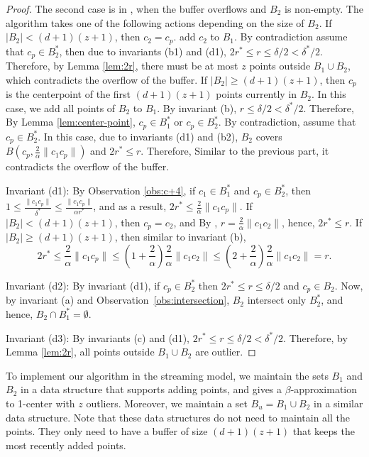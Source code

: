 \documentclass[envcountsame]{cls/cccg15}
\newcommand{\dz}{(d + 1)(z + 1)}
\newcommand{\len}[1]{\|{#1}\|}
\newcommand{\radius}[1]{\frac{2}{\alpha} \len{c_1 #1}}
\newcommand{\lee}{\leqslant}
\newcommand{\gee}{\geqslant}
\renewcommand{\leq}{\lee}
\renewcommand{\geq}{\gee}
\renewcommand{\ge}{\gee}
\begin{document}
\begin{proof}
The second case is in , when the buffer overflows and $B_2$ is non-empty.
The algorithm takes one of the following actions depending on the size of $B_2$.
If $|B_2| < \dz $, then $c_2 = c_p$.  add $c_2$ to $B_1$.
By contradiction assume that $c_p \in B_2^*$, then due to invariants (b1) and (d1), 
$2r^* \leq r \leq \delta/2 < \delta^*/2$. 
Therefore, by Lemma \ref{lem:2r}, there must be at most $z$ points outside $B_1 \cup B_2$,
which contradicts the overflow of the buffer. 
If $|B_2| \geq \dz$, then $c_p$ is the centerpoint of the first $\dz$ points currently in $B_2$. 
In this case, we add all points of $B_2$ to $B_1$. 
By invariant (b), $r \leq \delta/2 < \delta^*/2$. 
Therefore, By Lemma \ref{lem:center-point}, $c_p \in B_1^*$ or $c_p \in B_2^*$. 
By contradiction, assume that $c_p \in B_2^*$. 
In this case, due to invariants (d1) and (b2), 
$B_2$ covers $B(c_p, \radius{c_p})$ and $2r^* \leq r$. 
Therefore, Similar to the previous part, it contradicts the overflow of the buffer. 

Invariant (d1): 
By Observation \ref{obs:c+4}, if $c_1 \in B_1^*$ and $c_p \in B_2^*$,
then $1 \leq \frac{\len{c_1 c_p}}{\delta^*} \leq \frac{\len{c_1 c_p}}{\alpha r^*}$,
and as a result, $2r^* \leq \radius{c_p}$. 
If $|B_2| < \dz$, then $c_p = c_2$, and By , $r = \radius{c_2}$, hence, $2r^* \leq r$.
If $|B_2| \ge \dz$, then similar to invariant (b), 
$$
	2r^* \leq \radius{c_p} \leq (1 + \frac{2}{\alpha})\radius{c_2} \leq (2 + \frac{2}{\alpha})\radius{c_2} = r.
$$

Invariant (d2): By invariant (d1), if $c_p \in B_2^*$ then $2r^* \leq r \leq \delta /2$ and $c_p \in B_2$. 
Now, by invariant (a) and Observation~\ref{obs:intersection}, 
$B_2$ intersect only $B_2^*$, and hence, $B_2 \cap B_1^* = \emptyset$.

Invariant (d3): By invariants (c) and (d1), $2r^* \leq r \leq \delta/2 < \delta^* /2$. 
Therefore, by Lemma \ref{lem:2r}, all points outside $B_1 \cup B_2$ are outlier.

\end{proof}

To implement our algorithm in the streaming model,
we maintain the sets $B_1$ and $B_2$ 
in a data structure that supports adding points,
and gives a $\beta$-approximation to 1-center with $z$ outliers. %
Moreover, we maintain a set $B_u = B_1 \cup B_2$ in a similar data structure.
Note that these data structures do not need to maintain all the points. 
They only need to have a buffer of size $\dz$ that keeps the most recently added points.
\end{document}
